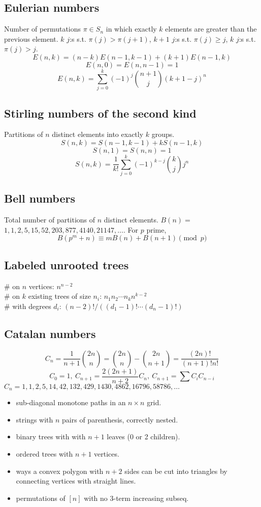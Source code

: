 	\subsection{Eulerian numbers}
		Number of permutations $\pi \in S_n$ in which exactly $k$ elements are greater than the previous element. $k$ $j$:s s.t. $\pi(j)>\pi(j+1)$, $k+1$ $j$:s s.t. $\pi(j)\geq j$, $k$ $j$:s s.t. $\pi(j)>j$.
		$$E(n,k) = (n-k)E(n-1,k-1) + (k+1)E(n-1,k)$$
		$$E(n,0) = E(n,n-1) = 1$$
		$$E(n,k) = \sum_{j=0}^k(-1)^j\binom{n+1}{j}(k+1-j)^n$$

	\subsection{Stirling numbers of the second kind}
		Partitions of $n$ distinct elements into exactly $k$ groups.
		$$S(n,k) = S(n-1,k-1) + k S(n-1,k)$$
		$$S(n,1) = S(n,n) = 1$$
		$$S(n,k) = \frac{1}{k!}\sum_{j=0}^k (-1)^{k-j}\binom{k}{j}j^n$$

	\subsection{Bell numbers}
		Total number of partitions of $n$ distinct elements. $B(n) =$
		$1, 1, 2, 5, 15, 52, 203, 877, 4140, 21147, \dots$. For $p$ prime,
		\[ B(p^m+n)\equiv mB(n)+B(n+1) \pmod{p} \]

	\subsection{Labeled unrooted trees}
		\# on $n$ vertices: $n^{n-2}$ \\
		\# on $k$ existing trees of size $n_i$: $n_1n_2\cdots n_k n^{k-2}$ \\
		\# with degrees $d_i$: $(n-2)! / ((d_1-1)! \cdots (d_n-1)!)$

	\subsection{Catalan numbers}
		\[ C_n=\frac{1}{n+1}\binom{2n}{n}= \binom{2n}{n}-\binom{2n}{n+1} = \frac{(2n)!}{(n+1)!n!} \]
		\[ C_0=1,\ C_{n+1} = \frac{2(2n+1)}{n+2}C_n,\ C_{n+1}=\sum C_iC_{n-i} \]
		${C_n = 1, 1, 2, 5, 14, 42, 132, 429, 1430, 4862, 16796, 58786, \dots}$
		\begin{itemize}[noitemsep]
			\item sub-diagonal monotone paths in an $n\times n$ grid.
			\item strings with $n$ pairs of parenthesis, correctly nested.
			\item binary trees with with $n+1$ leaves (0 or 2 children).
			\item ordered trees with $n+1$ vertices.
			\item ways a convex polygon with $n+2$ sides can be cut into triangles by connecting vertices with straight lines.
			\item permutations of $[n]$ with no 3-term increasing subseq.
		\end{itemize}
